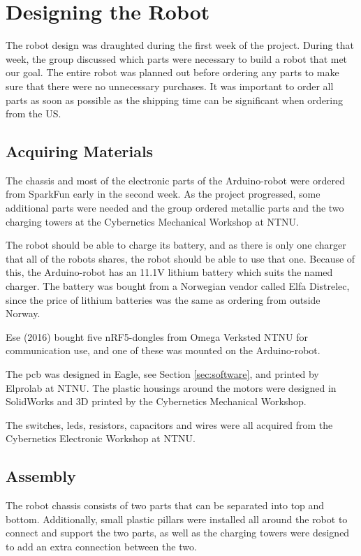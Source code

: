 \section{Designing the Robot}
\label{sec:robotdesign}
The robot design was draughted during the first week of the project. During that week, the group discussed which parts were necessary to build a robot that met our goal. The entire robot was planned out before ordering any parts to make sure that there were no unnecessary purchases. It was important to order all parts as soon as possible as the shipping time can be significant when ordering from the US.

\subsection{Acquiring Materials}
The chassis and most of the electronic parts of the Arduino-robot were ordered from SparkFun \cite{sparkfun} early in the second week. As the project progressed, some additional parts were needed and the group ordered metallic parts and the two charging towers at the Cybernetics Mechanical Workshop at NTNU.

The robot should be able to charge its battery, and as there is only one charger that all of the robots shares, the robot should be able to use that one. Because of this, the Arduino-robot has an 11.1V lithium battery which suits the named charger. The battery was bought from a Norwegian vendor called Elfa Distrelec\cite{elfa}, since the price of lithium batteries was the same as ordering from outside Norway.

Ese (2016) bought five nRF5-dongles from Omega Verksted NTNU  for communication use, and one of these was mounted on the Arduino-robot.

The \acrshort{pcb} was designed in Eagle, see Section \ref{sec:software}, and printed by Elprolab\cite{elprolab} at NTNU. The plastic housings around the motors were designed in SolidWorks and 3D printed by the Cybernetics Mechanical Workshop.

The switches, \acrshort{led}s, resistors, capacitors and wires were all acquired from the Cybernetics Electronic Workshop at NTNU.


\subsection{Assembly}
The robot chassis consists of two parts that can be separated into top and bottom. Additionally, small plastic pillars were installed all around the robot to connect and support the two parts, as well as the charging towers were designed to add an extra connection between the two.


